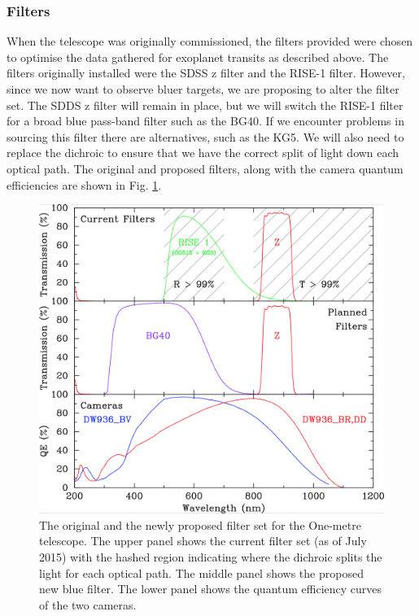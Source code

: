 \documentclass[a4paper,fleqn,usenatbib]{mnras}
\begin{document}
\subsubsection{Filters}
When the telescope was originally commissioned, the filters provided were chosen to optimise the data gathered for exoplanet transits as described above. The filters originally installed were the SDSS z filter and the RISE-1 filter. However, since we now want to observe bluer targets, we are proposing to alter the filter set. The SDDS z filter will remain in place, but we will switch the RISE-1 filter for a broad blue pass-band filter such as the BG40. If we encounter problems in sourcing this filter there are alternatives, such as the KG5. We will also need to replace the dichroic to ensure that we have the correct split of light down each optical path.  The original and proposed filters, along with the camera quantum efficiencies are shown in Fig. \ref{fig:filters}.

\begin{figure}
	\includegraphics[width=\columnwidth]{images/filters.png}
    \caption{The original and the newly proposed filter set for the One-metre telescope. The upper panel shows the current filter set (as of July 2015) with the hashed region indicating where the dichroic splits the light for each optical path. The middle panel shows the proposed new blue filter. The lower panel shows the quantum efficiency curves of the two cameras. }
    \label{fig:filters}
\end{figure}
\end{document}
